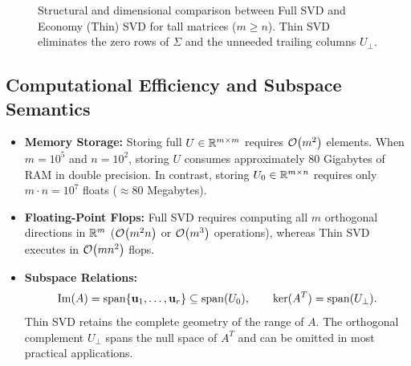 \begin{figure}[H]
{
}
\caption{Structural and dimensional comparison between Full SVD and Economy (Thin) SVD for tall matrices ($m \ge n$). Thin SVD eliminates the zero rows of $\Sigma$ and the unneeded trailing columns $U_{\perp}$.}
\label{fig:full-vs-thin-svd-structure-en}
\end{figure}

\subsection{Computational Efficiency and Subspace Semantics}

\begin{itemize}
    \item \textbf{Memory Storage:} Storing full $U \in \mathbb{R}^{m \times m}$ requires $\mathcal{O}\!\left(m^2\right)$ elements. When $m = 10^5$ and $n = 10^2$, storing $U$ consumes approximately $80$ Gigabytes of RAM in double precision. In contrast, storing $U_0 \in \mathbb{R}^{m \times n}$ requires only $m \cdot n = 10^7$ floats ($\approx 80$ Megabytes).
    \item \textbf{Floating-Point Flops:} Full SVD requires computing all $m$ orthogonal directions in $\mathbb{R}^m$ ($\mathcal{O}\!\left(m^2 n\right)$ or $\mathcal{O}\!\left(m^3\right)$ operations), whereas Thin SVD executes in $\mathcal{O}\!\left(m n^2\right)$ flops.
    \item \textbf{Subspace Relations:}
    \begin{equation}
        \operatorname{Im}(A) = \operatorname{span}\{\mathbf{u}_1, \dots, \mathbf{u}_r\} \subseteq \operatorname{span}(U_0), \qquad \ker(A^T) = \operatorname{span}(U_{\perp}).
    \end{equation}
    Thin SVD retains the complete geometry of the range of $A$. The orthogonal complement $U_{\perp}$ spans the null space of $A^T$ and can be omitted in most practical applications.
\end{itemize}

